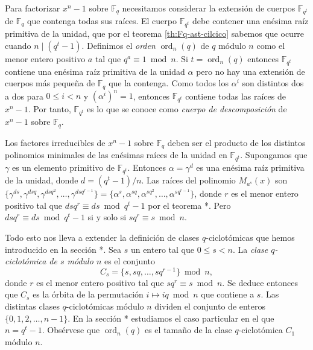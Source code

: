 Para factorizar \(x^n - 1\) sobre \(\mathbb F_q\) necesitamos considerar la extensión de cuerpos \(\mathbb F_{q^t}\) de \(\mathbb F_q\) que contenga todas sus raíces.
El cuerpo \(\mathbb F_{q^t}\) debe contener una enésima raíz primitiva de la unidad, que por el teorema \ref{th:Fq-ast-cilcico} sabemos que ocurre cuando \(n \mid (q^t - 1)\).
Definimos el \textit{orden} \(\operatorname{ord}_n(q)\) de \(q\) módulo \(n\) como el menor entero positivo \(a\) tal que \(q^{a} \equiv 1 \bmod n\).
Si \(t = \operatorname{ord}_n(q)\) entonces \(\mathbb F_{q^t}\) contiene una enésima raíz primitiva de la unidad \(\alpha\) pero no hay una extensión de cuerpos más pequeña de \(\mathbb F_q\) que la contenga.
Como todos los \(\alpha^{i}\) son distintos dos a dos para \(0 \leq i < n\) y \((\alpha^{i})^n = 1\), entonces \(\mathbb F_{q^t}\) contiene todas las raíces de \(x^n - 1\).
Por tanto, \(\mathbb F_{q^t}\) es lo que se conoce como \textit{cuerpo de descomposición} de \(x^n - 1\) sobre \(\mathbb F_q\).

Los factores irreducibles de \(x^n - 1\) sobre \(\mathbb F_q\) deben ser el producto de los distintos polinomios minimales de las enésimas raíces de la unidad en \(\mathbb F_{q^t}\).
Supongamos que \(\gamma\) es un elemento primitivo de \(\mathbb F_{q^t}\).
Entonces \(\alpha = \gamma^d\) es una enésima raíz primitiva de la unidad, donde \(d = (q^t - 1)/n\).
Las raíces del polinomio \(M_{a^s}(x)\) son \(\{\gamma^{ds}, \gamma^{dsq}, \gamma^{dsq^2}, \dots, \gamma^{dsq^{r-1}}\} = \{\alpha^s, \alpha^{sq}, \alpha^{sq^2}, \dots, \alpha^{sq^{r-1}}\}\), donde \(r\) es el menor entero positivo tal que \(dsq^r \equiv ds \bmod q^t - 1\) por el teorema *.
Pero \(dsq^r \equiv ds \bmod q^t - 1\) si y solo si \(sq^r \equiv s \bmod n\).

Todo esto nos lleva a extender la definición de clases \(q\)-ciclotómicas que hemos introducido en la sección *.
Sea \(s\) un entero tal que \(0 \leq s < n\).
La \textit{clase \(q\)-ciclotómica de \(s\) módulo \(n\)} es el conjunto
\[
  C_s = \{s, sq, \dots, sq^{r-1}\} \bmod n, 
\]
donde \(r\) es el menor entero positivo tal que \(sq^r \equiv s \bmod n\).
Se deduce entonces que \(C_s\) es la órbita de la permutación \(i \mapsto iq \bmod n\) que contiene a \(s\).
Las distintas clases \(q\)-ciclotómicas módulo \(n\) dividen el conjunto de enteros \(\{0, 1, 2, \dots, n - 1\}\).
En la sección * estudiamos el caso particular en el que \(n = q^t - 1\).
Obsérvese que \(\operatorname{ord}_n(q)\) es el tamaño de la clase \(q\)-ciclotómica \(C_1\) módulo \(n\).

